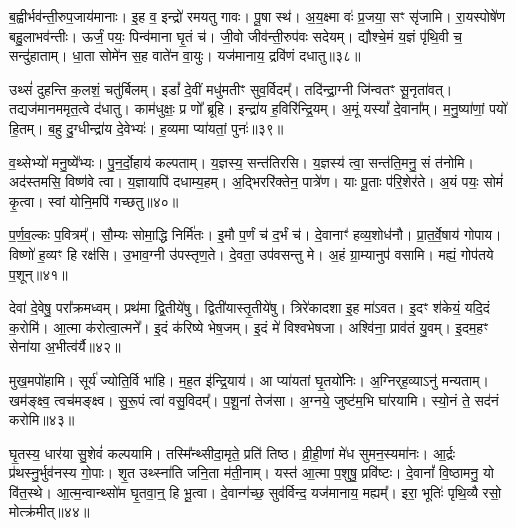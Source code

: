 ब॒ह्वीर्भव॑न्ती॒रुप॒जाय॑मानाः।
इ॒ह व॒ इन्द्रो॑ रमयतु गावः।
पू॒षा स्थ॑।
अ॒य॒क्ष्मा वः॑ प्र॒जया॒ सꣳ सृ॑जामि।
रा॒यस्पोषे॑ण बहु॒लाभव॑न्तीः।
ऊर्जं॒ पयः॒ पिन्व॑माना घृ॒तं च॑।
जी॒वो जीव॑न्ती॒रुप॑वः सदेयम्।
द्यौश्चे॒मं य॒ज्ञं पृ॑थि॒वी च॒ सन्दु॑हाताम्।
धा॒ता सोमे॑न स॒ह वाते॑न वा॒युः।
यज॑मानाय॒ द्रवि॑णं दधातु॥३८॥\ip

उथ्सं॑ दुहन्ति क॒लशं॒ चतु॑र्बिलम्।
इडां᳚ दे॒वीं मधु॑मतीꣳ सुव॒र्विदम्᳚।
तदि॑न्द्रा॒ग्नी जि॑न्वतꣳ सू॒नृता॑वत्।
तद्यज॑मान\-ममृत॒त्वे द॑धातु।
काम॑धुक्षः॒ प्र णो᳚ ब्रूहि।
इन्द्रा॑य ह॒विरि॑न्द्रि॒यम्।
अ॒मूं यस्यां᳚ दे॒वाना᳚म्।
म॒नु॒ष्या॑णां॒ पयो॑ हि॒तम्।
ब॒हु दु॒ग्धीन्द्रा॑य दे॒वेभ्यः॑।
ह॒व्यमा प्या॑यतां॒ पुनः॑॥३९॥\ip

व॒थ्सेभ्यो॑ मनु॒ष्ये᳚भ्यः।
पु॒न॒र्दो॒हाय॑ कल्पताम्।
य॒ज्ञस्य॒ सन्त॑\-ति\-रसि।
य॒ज्ञस्य॑ त्वा॒ सन्त॑\-ति॒\-मनु॒ सं त॑नोमि।
अद॑स्तमसि॒ विष्ण॑वे त्वा।
य॒ज्ञायापि॑ दधाम्य॒हम्।
अ॒द्भिररि॑क्तेन॒ पात्रे॑ण।
याः पू॒ताः प॑रि॒शेर॑ते।
अ॒यं पयः॒ सोमं॑ कृ॒त्वा।
स्वां योनि॒मपि॑ गच्छतु॥४०॥\ip

प॒र्ण॒व॒ल्कः प॒वित्रम्᳚।
सौ॒म्यः सोमा॒द्धि निर्मि॑तः।
इ॒मौ प॒र्णं च॑ द॒र्भं च॑।
दे॒वानाꣳ॑ हव्य॒शोध॑नौ।
प्रा॒त॒र्वे॒षाय॑ गोपाय।
विष्णो॑ ह॒व्यꣳ हि रक्ष॑सि।
उ॒भाव॒ग्नी उ॑पस्तृण॒ते।
दे॒वता॒ उप॑वसन्तु मे।
अ॒हं ग्रा॒म्यानुप॑ वसामि।
मह्यं॒ गोप॑तये प॒शून्॥४१॥\ip\anuvakamend[आभृ॑त इ॒मं गृ॑ह्णामि॒ पूर्व॒स्ताः पूर्वः॒ परि॑गृह्णामि सभापा॒ला इन्द्र॑ज्येष्ठेभ्य॒ आदि॑त्य व्रतपते सुस॒म्भृता॑ मे स॒ह पु॑नातु गहि नो वि॒श्वरू॑पा दधातु॒ पुन॑र्गच्छतु प॒शून् (याः पु॒रस्ता॑दि॒मामूर्ज॑मि॒ह प्र॒जा इ॒ह प॒शवो॒ऽयं पि॑तृ॒णाम॒ग्निः।)]

देवा॑ दे॒वेषु॒ परा᳚क्रमध्वम्।
प्रथ॑मा द्वि॒तीये॑षु।
द्विती॑यास्तृ॒तीये॑षु।
त्रिरे॑कादशा इ॒ह मा॑ऽवत।
इ॒दꣳ श॑केयं॒ यदि॒दं क॒रोमि॑।
आ॒त्मा क॑रोत्वा॒त्मने᳚।
इ॒दं क॑रिष्ये भेष॒जम्।
इ॒दं मे॑ विश्वभेषजा।
अश्वि॑ना॒ प्राव॑तं यु॒वम्।
इ॒दम॒हꣳ सेना॑या अ॒भीत्व॑र्यै॥४२॥\ip

मुख॒मपो॑हामि।
सूर्य॑ ज्योति॒र्वि भा॑हि।
म॒ह॒त इ॑न्द्रि॒याय॑।
आ प्या॑यतां घृ॒तयो॑निः।
अ॒ग्निर्‌\mbox{}ह॒व्याऽनु॑ मन्यताम्।
खम॑ङ्क्ष्व॒ त्वच॑मङ्क्ष्व।
सु॒रू॒पं त्वा॑ वसु॒विदम्᳚।
प॒शू॒नां तेज॑सा।
अ॒ग्नये॒ जुष्ट॑म॒भि घा॑रयामि।
स्यो॒नं ते॒ सद॑नं करोमि॥४३॥\ip

घृ॒तस्य॒ धार॑या सु॒शेवं॑ कल्पयामि।
तस्मि᳚न्थ्सीदा॒मृते॒ प्रति॑ तिष्ठ।
व्री॒ही॒णां मे॑ध सुमन॒स्यमा॑नः।
आ॒र्द्रः प्र॑थस्नु॒र्भुव॑नस्य गो॒पाः।
शृ॒त उथ्स्ना॑ति जनि॒ता म॑ती॒नाम्।
यस्त॑ आ॒त्मा प॒शुषु॒ प्रवि॑ष्टः।
दे॒वानां᳚ वि॒ष्ठामनु॒ यो वि॑त॒स्थे।
आ॒त्म॒न्वान्थ्सो॑म घृ॒तवा॒न्॒ हि भू॒त्वा।
दे॒वान्ग॑च्छ॒ सुव॑र्विन्द॒ यज॑मानाय॒ मह्यम्᳚।
इरा॒ भूतिः॑ पृथि॒व्यै रसो॒ मोत्क्र॑मीत्॥४४॥\ip

